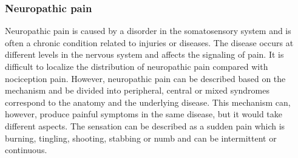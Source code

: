 

\subsubsection{Neuropathic pain}
Neuropathic pain is caused by a disorder in the somatosensory system and is often a chronic condition related to injuries or diseases. The disease occurs at different levels in the nervous system and affects the signaling of pain. It is difficult to localize the distribution of neuropathic pain compared with nociception pain. However, neuropathic pain can be described based on the mechanism and be divided into peripheral, central or mixed syndromes correspond to the anatomy and the underlying disease. This mechanism can, however, produce painful symptoms in the same disease, but it would take different aspects. The sensation can be described as a sudden pain which is burning, tingling, shooting, stabbing or numb and can be intermittent or continuous. \cite{Mindruta2013}


